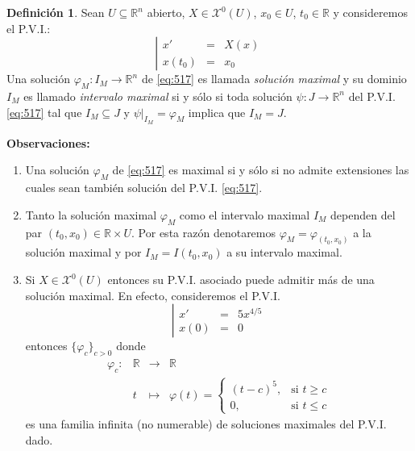 \documentclass[11pt,a4paper]{article}
\theoremstyle{definition}
\newtheorem{definicion}{Definición}[section]
\theoremstyle{plain}
\theoremstyle{remark}
\begin{document}
	\begin{definicion}
		Sean $U \subseteq \mathbb{R}^n$ abierto, $X \in \mathcal{X}^0(U)$, $x_0 \in U$, $t_0 \in \mathbb{R}$ y consideremos el P.V.I.:
		\begin{equation}\label{eq:517}
			\left| 
			\begin{array}{lcl}
				x' &=& X(x) \\
				x(t_0) &=& x_0
			\end{array}
			\right.
		\end{equation}
		Una solución $\varphi_M : I_M \to \mathbb{R}^n$ de \eqref{eq:517} es llamada \textit{solución maximal} y su dominio $I_M$ es llamado \textit{intervalo maximal} si y sólo si toda solución $\psi : J \to \mathbb{R}^n$ del P.V.I. \eqref{eq:517} tal que $I_M \subseteq J$ y $\left.\psi\right|_{I_M} = \varphi_M$ implica que $I_M = J$.
	\end{definicion}
	\noindent \textbf{Observaciones:}
	\begin{enumerate}
		\item Una solución $\varphi_M$ de \eqref{eq:517} es maximal si y sólo si no admite extensiones las cuales sean también solución del P.V.I. \eqref{eq:517}.
		\item Tanto la solución maximal $\varphi_M$ como el intervalo maximal $I_M$ dependen del par $(t_0, x_0) \in \mathbb{R} \times U$. Por esta razón denotaremos $\varphi_M = \varphi_{(t_0, x_0)}$ a la solución maximal y por $I_M = I(t_0, x_0)$ a su intervalo maximal.
		\item Si $X \in \mathcal{X}^0(U)$ entonces su P.V.I. asociado puede admitir más de una solución maximal. En efecto, consideremos el P.V.I.
		\begin{equation*}
			\left| 
			\begin{array}{lcl}
				x' &=& 5x^{4/5} \\
				x(0) &=& 0
			\end{array}
			\right.
		\end{equation*}
		entonces $\{\varphi_c\}_{c > 0}$ donde
		\[
		\begin{array}{rcccl}
			\varphi_c : & \mathbb{R} &\to& \mathbb{R} \\
			& t &\mapsto& \varphi(t) = \begin{cases} (t - c)^5, & \text{si } t \ge c \\ 0, & \text{si } t \le c \end{cases}
		\end{array}
		\]
		es una familia infinita (no numerable) de soluciones maximales del P.V.I. dado.
	\end{enumerate}
	
\end{document}
